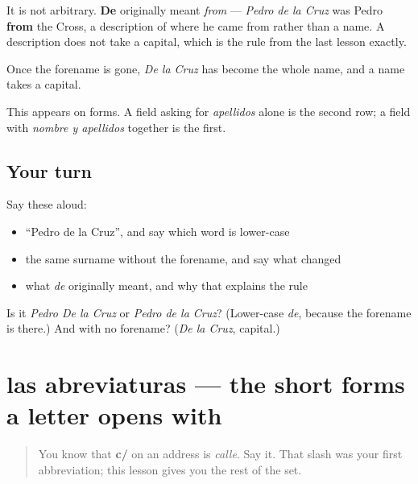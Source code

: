 \begin{grammarlens}[title={Grammar Lens: why the rule has that shape}]
It is not arbitrary. \textbf{De} originally meant \emph{from} — \emph{Pedro de la Cruz} was Pedro \textbf{from} the Cross, a description of where he came from rather than a name. A description does not take a capital, which is the rule from the last lesson exactly.

Once the forename is gone, \emph{De la Cruz} has become the whole name, and a name takes a capital.

This appears on forms. A field asking for \emph{apellidos} alone is the second row; a field with \emph{nombre y apellidos} together is the first.
\end{grammarlens}

\subsection*{Your turn}
Say these aloud:

\begin{itemize}
\raggedright
  \item \textquotedblleft{}Pedro de la Cruz\textquotedblright{}, and say which word is lower-case
  \item the same surname without the forename, and say what changed
  \item what \emph{de} originally meant, and why that explains the rule
\end{itemize}

\begin{tcolorbox}[breakable,colback=teal!4,colframe=teal!35!black,title={Before you move on}]
Is it \emph{Pedro De la Cruz} or \emph{Pedro de la Cruz}? (Lower-case \emph{de}, because the forename is there.) And with no forename? (\emph{De la Cruz}, capital.)
\end{tcolorbox}
\section[las abreviaturas]{las abreviaturas — the short forms a letter opens with}

\label{lesson:ES-C426-abreviaturas}



\begin{quote}
You know that \textbf{c/} on an address is \emph{calle}. Say it. That slash was your first abbreviation; this lesson gives you the rest of the set.
\end{quote}

